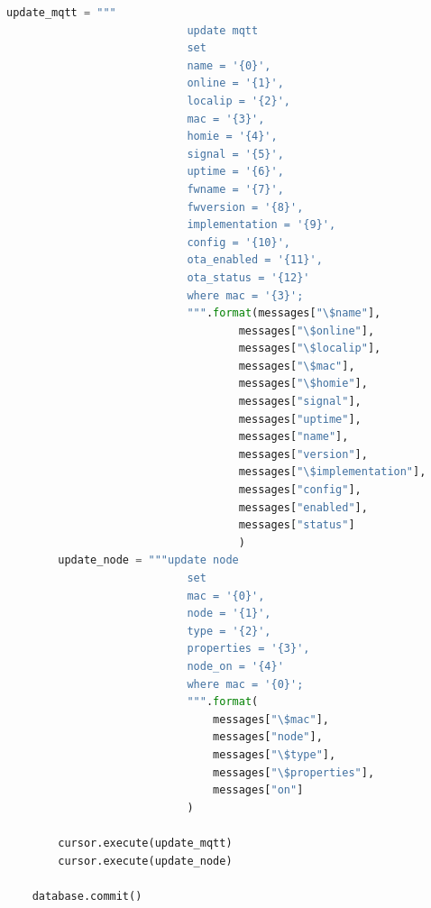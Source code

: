 \documentclass[times, utf8, zavrsni]{fer}
\begin{document}
\begin{lstlisting}[language=Python, caption=Parsiranje poruka i spremanje u bazu podataka]
        update_mqtt = """
                            update mqtt
                            set
                            name = '{0}',
                            online = '{1}',
                            localip = '{2}',
                            mac = '{3}',
                            homie = '{4}',
                            signal = '{5}',
                            uptime = '{6}',
                            fwname = '{7}',
                            fwversion = '{8}',
                            implementation = '{9}',
                            config = '{10}',
                            ota_enabled = '{11}',
                            ota_status = '{12}'
                            where mac = '{3}';
                            """.format(messages["\$name"],
                                    messages["\$online"],
                                    messages["\$localip"],
                                    messages["\$mac"],
                                    messages["\$homie"],
                                    messages["signal"],
                                    messages["uptime"],
                                    messages["name"],
                                    messages["version"],
                                    messages["\$implementation"],
                                    messages["config"],
                                    messages["enabled"],
                                    messages["status"]
                                    )
        update_node = """update node
                            set
                            mac = '{0}',
                            node = '{1}',
                            type = '{2}',
                            properties = '{3}',
                            node_on = '{4}'
                            where mac = '{0}';
                            """.format(
                                messages["\$mac"],
                                messages["node"],
                                messages["\$type"],
                                messages["\$properties"],
                                messages["on"]
                            )

        cursor.execute(update_mqtt)
        cursor.execute(update_node)

    database.commit()

\end{lstlisting}
\end{document}
